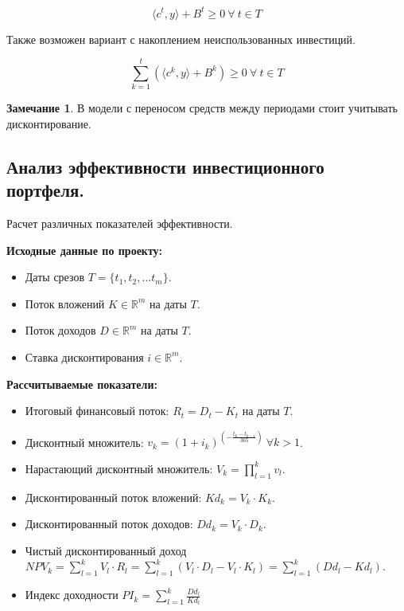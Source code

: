 \documentclass[reqno]{article}
\theoremstyle{definition}
\newtheorem*{nb}{Замечание}
\theoremstyle{definition}
\theoremstyle{definition}
\theoremstyle{definition}
\theoremstyle{definition}
\theoremstyle{definition}
\theoremstyle{definition}
\theoremstyle{definition}
\theoremstyle{definition}
\begin{document}
			$$\langle c^t, y\rangle + B^t \geq 0\ \forall\ t \in T$$
			
			Также возможен вариант с накоплением неиспользованных инвестиций.
			
			$$\sum\limits^{t}_{k=1} (\langle c^k, y\rangle + B^k) \geq 0\ \forall\ t \in T$$

			\begin{nb}
				В модели с переносом средств между периодами стоит учитывать дисконтирование.	
			\end{nb}
		
		\subsection{Анализ эффективности инвестиционного портфеля.}
		
		Расчет различных показателей эффективности.
		
		\textbf{Исходные данные по проекту:}
		\begin{itemize}
			\item Даты срезов $T = \{t_1, t_2, ... t_m\}$.
			\item Поток вложений $K \in \mathds{R}^m$ на даты $T$.
			\item Поток доходов $D \in \mathds{R}^m$ на даты $T$.
			\item Ставка дисконтирования $i \in \mathds{R}^m$.
		\end{itemize}
	
		\textbf{Рассчитываемые показатели:}
		\begin{itemize}
			\item Итоговый финансовый поток: $R_t = D_t - K_t$ на даты $T$.
			\item Дисконтный множитель: $v_k = (1 + i_k)^{(- \frac{t_k - t_{k-1}}{365})}\ \forall k > 1$.
			\item Нарастающий дисконтный множитель: $V_k = \prod\limits^k_{l = 1} v_l$.
			\item Дисконтированный поток вложений: ${Kd}_k = V_k\cdot K_k$.
			\item Дисконтированный поток доходов: ${Dd}_k = V_k\cdot D_k$.
			\item Чистый дисконтированный доход $NPV_k = \sum\limits^k_{l = 1} V_l\cdot R_l = \sum\limits^k_{l = 1} (V_l\cdot D_l - V_l\cdot K_l) = \sum\limits^k_{l = 1} ({Dd}_l - {Kd}_l)$.
			\item Индекс доходности ${PI}_k = \sum\limits^k_{l=1} \frac{{Dd}_l}{{Kd}_l}$
		\end{itemize}
	
\end{document}
